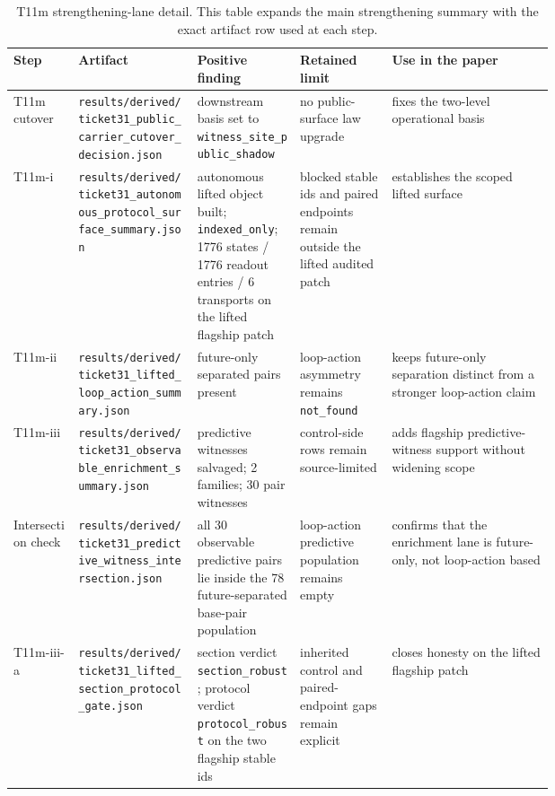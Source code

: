 \documentclass[11pt]{article}
\theoremstyle{definition}
\begin{document}
\begin{table}[p]
\centering
\scriptsize
\caption{T11m strengthening-lane detail. This table expands the main strengthening summary
with the exact artifact row used at each step.}
\label{tab:appendix-t11m-detail}
\begin{tabularx}{\linewidth}{@{}>{\raggedright\arraybackslash}p{0.12\linewidth}>{\raggedright\arraybackslash}p{0.22\linewidth}>{\raggedright\arraybackslash}p{0.19\linewidth}>{\raggedright\arraybackslash}p{0.17\linewidth}>{\raggedright\arraybackslash}X@{}}
\toprule
Step & Artifact & Positive finding & Retained limit & Use in the paper \\
\midrule
T11m cutover & \nolinkurl{results/derived/ticket31_public_carrier_cutover_decision.json} & downstream basis set to \nolinkurl{witness_site_public_shadow} & no public-surface law upgrade & fixes the two-level operational basis \\
T11m-i & \nolinkurl{results/derived/ticket31_autonomous_protocol_surface_summary.json} & autonomous lifted object built; \texttt{indexed\_only}; 1776 states / 1776 readout entries / 6 transports on the lifted flagship patch & blocked stable ids and paired endpoints remain outside the lifted audited patch & establishes the scoped lifted surface \\
T11m-ii & \nolinkurl{results/derived/ticket31_lifted_loop_action_summary.json} & future-only separated pairs present & loop-action asymmetry remains \texttt{not\_found} & keeps future-only separation distinct from a stronger loop-action claim \\
T11m-iii & \nolinkurl{results/derived/ticket31_observable_enrichment_summary.json} & predictive witnesses salvaged; 2 families; 30 pair witnesses & control-side rows remain source-limited & adds flagship predictive-witness support without widening scope \\
Intersection check & \nolinkurl{results/derived/ticket31_predictive_witness_intersection.json} & all 30 observable predictive pairs lie inside the 78 future-separated base-pair population & loop-action predictive population remains empty & confirms that the enrichment lane is future-only, not loop-action based \\
T11m-iii-a & \nolinkurl{results/derived/ticket31_lifted_section_protocol_gate.json} & section verdict \texttt{section\_robust}; protocol verdict \texttt{protocol\_robust} on the two flagship stable ids & inherited control and paired-endpoint gaps remain explicit & closes honesty on the lifted flagship patch \\

\end{tabularx}
\end{table}
\end{document}
